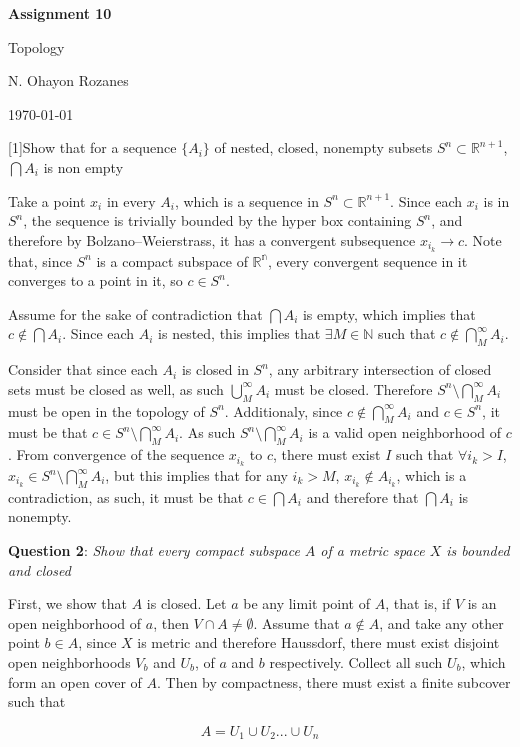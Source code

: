 \documentclass{article} %
\newcommand{\question}[2][]{
  \begin{flushleft}
    \textbf{Question #1}: \textit{#2}

\end{flushleft}}
\newcommand{\maketitletwo}[2][]{
  \begin{center}
    \Large{\textbf{Assignment #1}

    Topology} %
    \vspace{5pt}

    \normalsize{N. Ohayon Rozanes  %

    \today}        %
    \vspace{15pt}

\end{center}}
\begin{document}
\maketitletwo[10]  %

\question[1]{Show that for a sequence $\{A_i\}$ of nested, closed,
nonempty subsets $S^n \subset\mathbb{R}^{n+1}$, $\bigcap A_i$ is non empty}

Take a point $x_i$ in every $A_i$, which is a sequence in $S^n
\subset \mathbb{R}^{n+1}$. Since each $x_i$ is in $S^n$, the sequence
is trivially bounded by the hyper box containing $S^n$, and therefore
by Bolzano–Weierstrass, it has a convergent subsequence $x_{i_k} \to
c$. Note that, since $S^n$ is a compact subspace of $\mathbb{R^n}$,
every convergent sequence in it converges to a point in it, so $c \in S^n$.

Assume for the sake of contradiction that $\bigcap A_i$ is empty,
which implies that $c \notin \bigcap A_i$. Since each $A_i$ is
nested, this implies that $\exists M \in \mathbb{N}$ such that  $c
\notin \bigcap_M^\infty A_i$.

Consider that since each $A_i$ is closed in $S^n$, any arbitrary
intersection of closed sets must be closed as well, as such
$\bigcup_M^\infty A_i$ must
be closed. Therefore $S^n \setminus \bigcap_M^\infty A_i$ must be
open in the topology
of $S^n$. Additionaly, since $c\notin \bigcap_M^\infty A_i$ and $c
\in S^n$, it must
be that $c \in S^n \setminus \bigcap_M^\infty A_i$. As such $S^n
\setminus \bigcap_M^\infty A_i $ is a valid open neighborhood of $c$.
From convergence of the sequence ${x_{i_k}}$ to $c$, there must exist
$I$ such that $\forall i_k > I$, $x_{i_k} \in S^n \setminus
\bigcap_M^\infty A_i$, but this implies that for any $i_k > M$,
$x_{i_k} \notin A_{i_k}$, which is a contradiction, as such, it must
be that $c \in \bigcap A_i$ and therefore that $\bigcap A_i$ is nonempty.

\question[2]{Show that every compact subspace $A$ of a metric space $X$ is
bounded and closed}

First, we show that $A$ is closed. Let $a$ be any limit point of $A$,
that is, if $V$ is an open neighborhood of $a$, then $V \cap A \neq
\emptyset$. Assume that $a \notin A$, and take any other point $b\in
A$, since $X$ is metric and therefore Haussdorf, there must exist
disjoint open neighborhoods $V_b$ and $U_b$, of $a$ and $b$
respectively. Collect all such $U_b$, which form an open cover of
$A$. Then by compactness, there must exist a finite subcover such that

\[
  A = U_1 \cup U_2 ... \cup U_n
\]
\end{document}
